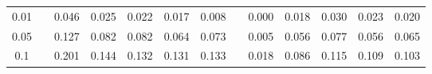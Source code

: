 % 
\begin{tabular}{ccccccccccccc}
  \hline
  \hline
0.01 &  & 0.046 & 0.025 & 0.022 & 0.017 & 0.008 &  & 0.000 & 0.018 & 0.030 & 0.023 & 0.020 \\ 
  0.05 &  & 0.127 & 0.082 & 0.082 & 0.064 & 0.073 &  & 0.005 & 0.056 & 0.077 & 0.056 & 0.065 \\ 
  0.1 &  & 0.201 & 0.144 & 0.132 & 0.131 & 0.133 &  & 0.018 & 0.086 & 0.115 & 0.109 & 0.103 \\ 
   \hline
\end{tabular}
